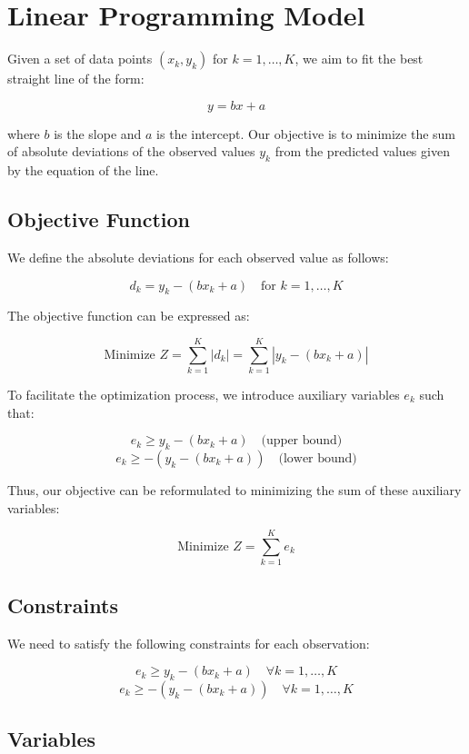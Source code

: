 \documentclass{article}
\begin{document}
\section*{Linear Programming Model}

Given a set of data points $(x_k, y_k)$ for $k = 1, \ldots, K$, we aim to fit the best straight line of the form:

\[
y = bx + a
\]

where \( b \) is the slope and \( a \) is the intercept. Our objective is to minimize the sum of absolute deviations of the observed values \( y_k \) from the predicted values given by the equation of the line.

\subsection*{Objective Function}

We define the absolute deviations for each observed value as follows:

\[
d_k = y_k - (bx_k + a) \quad \text{for } k = 1, \ldots, K
\]

The objective function can be expressed as:

\[
\text{Minimize } Z = \sum_{k=1}^{K} |d_k| = \sum_{k=1}^{K} |y_k - (bx_k + a)|
\]

To facilitate the optimization process, we introduce auxiliary variables \( e_k \) such that:

\[
e_k \geq y_k - (bx_k + a) \quad \text{(upper bound)}
\]
\[
e_k \geq -(y_k - (bx_k + a)) \quad \text{(lower bound)}
\]

Thus, our objective can be reformulated to minimizing the sum of these auxiliary variables:

\[
\text{Minimize } Z = \sum_{k=1}^{K} e_k
\]

\subsection*{Constraints}

We need to satisfy the following constraints for each observation:

\[
e_k \geq y_k - (bx_k + a) \quad \forall k = 1, \ldots, K
\]
\[
e_k \geq -(y_k - (bx_k + a)) \quad \forall k = 1, \ldots, K
\]

\subsection*{Variables}
\end{document}
